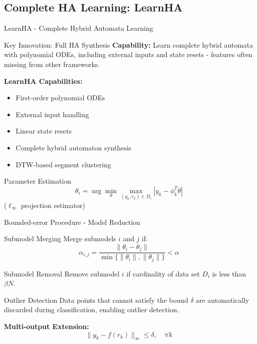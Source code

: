 \documentclass[aspectratio=169]{beamer}
\begin{document}
\subsection{Complete HA Learning: LearnHA}

\begin{frame}{LearnHA - Complete Hybrid Automata Learning}
\begin{block}{Key Innovation: Full HA Synthesis}
\textbf{Capability:} Learn complete hybrid automata with polynomial ODEs, including external inputs and state resets - features often missing from other frameworks.
\end{block}

\textbf{LearnHA Capabilities:}
\begin{itemize}
\item First-order polynomial ODEs
\item External input handling
\item Linear state resets
\item Complete hybrid automaton synthesis
\item DTW-based segment clustering
\end{itemize}

\begin{block}{Parameter Estimation}
$$\theta_i = \arg\min_\theta \max_{(y_k,r_k) \in D_i} |y_k - \phi_k^T \theta|$$
($\ell_\infty$ projection estimator)
\end{block}
\end{frame}

\begin{frame}{Bounded-error Procedure - Model Reduction}
\begin{block}{Submodel Merging}
Merge submodels $i$ and $j$ if:
$$\alpha_{i,j} = \frac{\|\theta_i - \theta_j\|}{\min\{\|\theta_i\|, \|\theta_j\|\}} < \alpha$$
\end{block}

\begin{block}{Submodel Removal}
Remove submodel $i$ if cardinality of data set $D_i$ is less than $\beta N$.
\end{block}

\begin{alertblock}{Outlier Detection}
Data points that cannot satisfy the bound $\delta$ are automatically discarded during classification, enabling outlier detection.
\end{alertblock}

\textbf{Multi-output Extension:}
$$\|y_k - f(r_k)\|_\infty \leq \delta, \quad \forall k$$
\end{frame}
\end{document}
